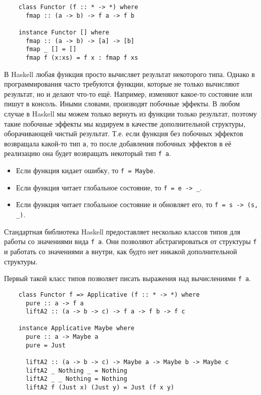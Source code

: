 \begin{verbatim}
    class Functor (f :: * -> *) where
      fmap :: (a -> b) -> f a -> f b

    instance Functor [] where
      fmap :: (a -> b) -> [a] -> [b]
      fmap _ [] = []
      fmap f (x:xs) = f x : fmap f xs
\end{verbatim}

В Haskell любая функция просто вычисляет результат некоторого типа.
Однако в программирования часто требуются функции, которые не только вычисляют результат, но и делают что-то ещё.
Например, изменяют какое-то состояние или пишут в консоль.
Иными словами, производят побочные эффекты.
В любом случае в Haskell мы можем только вернуть из функции только результат, поэтому такие побочные эффекты мы кодируем в качестве дополнительной структуры, оборачивающей чистый результат.
Т.е. если функция без побочных эффектов возвращала какой-то тип \texttt{a}, то после добавления побочных эффектов в её реализацию она будет возвращать некоторый тип  \texttt{f a}.

\begin{itemize}
    \item Если функция кидает ошибку, то \texttt{f = Maybe}.
    \item Если функция читает глобальное состояние, то \texttt{f = e -> \_}.
    \item Если функция читает глобальное состояние и обновляет его, то \texttt{f = s -> (s, \_)}.
\end{itemize}

Стандартная библиотека Haskell предоставляет несколько классов типов для работы со значениями вида \texttt{f a}.
Они позволяют абстрагироваться от структуры \texttt{f} и работать со значениями \texttt{a} внутри, как будто нет никакой дополнительной структуры.

Первый такой класс типов позволяет писать выражения над вычислениями \texttt{f a}.
\begin{verbatim}
    class Functor f => Applicative (f :: * -> *) where
      pure :: a -> f a
      liftA2 :: (a -> b -> c) -> f a -> f b -> f c

    instance Applicative Maybe where
      pure :: a -> Maybe a
      pure = Just

      liftA2 :: (a -> b -> c) -> Maybe a -> Maybe b -> Maybe c
      liftA2 _ Nothing _ = Nothing
      liftA2 _ _ Nothing = Nothing
      liftA2 f (Just x) (Just y) = Just (f x y)
\end{verbatim}


